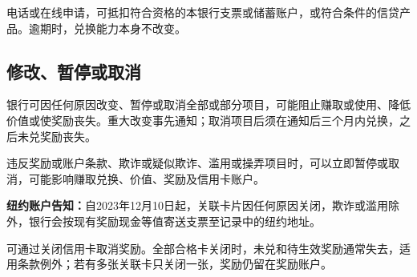 \documentclass[UTF8,fontset=none,11pt,a4paper]{ctexart}
\begin{document}
电话或在线申请，可抵扣符合资格的本银行支票或储蓄账户，或符合条件的信贷产品。逾期时，兑换能力本身不改变。


\subsection*{修改、暂停或取消}
银行可因任何原因改变、暂停或取消全部或部分项目，可能阻止赚取或使用、降低价值或使奖励丧失。重大改变事先通知；取消项目后须在通知后三个月内兑换，之后未兑奖励丧失。


违反奖励或账户条款、欺诈或疑似欺诈、滥用或操弄项目时，可以立即暂停或取消，可能影响赚取兑换、价值、奖励及信用卡账户。


\textbf{纽约账户告知：}自2023年12月10日起，关联卡片因任何原因关闭，欺诈或滥用除外，银行会按现有奖励现金等值寄送支票至记录中的纽约地址。


可通过关闭信用卡取消奖励。全部合格卡关闭时，未兑和待生效奖励通常失去，适用条款例外；若有多张关联卡只关闭一张，奖励仍留在奖励账户。
\end{document}
